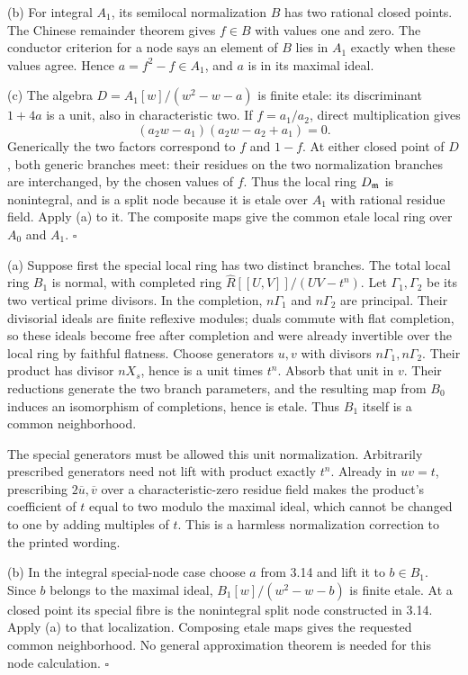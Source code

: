 \documentclass[11pt]{article}
\let\chapterexercise\exercise
\renewcommand{\exercise}[2]{\Needspace{8\baselineskip}\chapterexercise{#1}{#2}}
\begin{document}
(b) For integral $A_1$, its semilocal normalization $B$ has two rational closed points. The Chinese remainder theorem gives $f\in B$ with values one and zero. The conductor criterion for a node says an element of $B$ lies in $A_1$ exactly when these values agree. Hence $a=f^2-f\in A_1$, and $a$ is in its maximal ideal.

(c) The algebra $D=A_1[w]/(w^2-w-a)$ is finite etale: its discriminant $1+4a$ is a unit, also in characteristic two. If $f=a_1/a_2$, direct multiplication gives
\[ (a_2w-a_1)(a_2w-a_2+a_1)=0. \]
Generically the two factors correspond to $f$ and $1-f$. At either closed point of $D$, both generic branches meet: their residues on the two normalization branches are interchanged, by the chosen values of $f$. Thus the local ring $D_\mathfrak m$ is nonintegral, and is a split node because it is etale over $A_1$ with rational residue field. Apply (a) to it. The composite maps give the common etale local ring over $A_0$ and $A_1$. \hfill$\square$

\pf (a) Suppose first the special local ring has two distinct branches. The total local ring $B_1$ is normal, with completed ring $\widehat R[[U,V]]/(UV-t^n)$. Let $\Gamma_1,\Gamma_2$ be its two vertical prime divisors. In the completion, $n\Gamma_1$ and $n\Gamma_2$ are principal. Their divisorial ideals are finite reflexive modules; duals commute with flat completion, so these ideals become free after completion and were already invertible over the local ring by faithful flatness. Choose generators $u,v$ with divisors $n\Gamma_1,n\Gamma_2$. Their product has divisor $nX_s$, hence is a unit times $t^n$. Absorb that unit in $v$. Their reductions generate the two branch parameters, and the resulting map from $B_0$ induces an isomorphism of completions, hence is etale. Thus $B_1$ itself is a common neighborhood.

The special generators must be allowed this unit normalization. Arbitrarily prescribed generators need not lift with product exactly $t^n$. Already in $uv=t$, prescribing $2\overline u,\overline v$ over a characteristic-zero residue field makes the product's coefficient of $t$ equal to two modulo the maximal ideal, which cannot be changed to one by adding multiples of $t$. This is a harmless normalization correction to the printed wording.

(b) In the integral special-node case choose $a$ from 3.14 and lift it to $b\in B_1$. Since $b$ belongs to the maximal ideal, $B_1[w]/(w^2-w-b)$ is finite etale. At a closed point its special fibre is the nonintegral split node constructed in 3.14. Apply (a) to that localization. Composing etale maps gives the requested common neighborhood. No general approximation theorem is needed for this node calculation. \hfill$\square$
\end{document}
